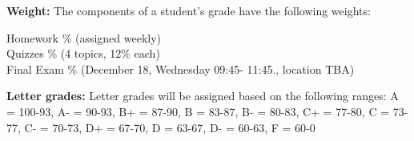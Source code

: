 \documentclass[12pt]{article}\usepackage[]{graphicx}\usepackage[]{color}
\begin{document}
\begin{center} 
\begin{minipage}{6.5in}
\begin{flushleft}
\textbf{Weight:} The components of a student's grade have the following weights:\\
\begin{center} 
\begin{minipage}{6in}
\begin{flushleft}
Homework \%  (assigned weekly) \\
Quizzes \%  (4 topics, 12\% each) \\
Final Exam \% (December 18, Wednesday 09:45- 11:45., location TBA) \\
\end{flushleft}
\end{minipage}
\end{center}
\end{flushleft}
\end{minipage}
\end{center}

\begin{center} 
\begin{minipage}{6.5in}
\begin{flushleft}
\textbf{Letter grades:} 
Letter grades will be assigned based on the following ranges: A = 100-93, A- = 90-93, B+ = 87-90, B = 83-87, B- = 80-83, C+ = 77-80, C = 73-77, C- = 70-73, D+ = 67-70, D = 63-67, D- = 60-63, F = 60-0
\end{flushleft}
\end{minipage}
\end{center}
\end{document}
